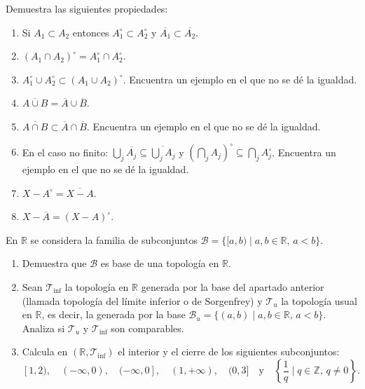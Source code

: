 \begin{ejer}[38]
Demuestra las siguientes propiedades:
\begin{enumerate}
    \item[a)] Si $A_1 \subset A_2$ entonces $A_1^\circ \subset A_2^\circ$ y $\overline{A_1} \subset \overline{A_2}$.
    \item[b)] $(A_1 \cap A_2)^\circ = A_1^\circ \cap A_2^\circ$.
    \item[c)] $A_1^\circ \cup A_2^\circ \subset (A_1 \cup A_2)^\circ$. Encuentra un ejemplo en el que no se dé la igualdad.
    \item[d)] $\overline{A \cup B} = \overline{A} \cup \overline{B}$.
    \item[e)] $\overline{A \cap B} \subset \overline{A} \cap \overline{B}$. Encuentra un ejemplo en el que no se dé la igualdad.
    \item[f)] En el caso no finito: $\bigcup_j \overline{A_j} \subseteq \overline{\bigcup_j A_j}$ y $\left(\bigcap_j A_j\right)^\circ \subseteq \bigcap_j A_j^\circ$. Encuentra un ejemplo en el que no se dé la igualdad.
    \item[g)] $X - A^\circ = \overline{X - A}$.
    \item[h)] $X - \overline{A} = (X - A)^\circ$.
\end{enumerate}
\end{ejer}

\begin{ejer}[39]
En $\mathbb{R}$ se considera la familia de subconjuntos $\mathcal{B} = \{[a,b) \mid a,b \in \mathbb{R}, \, a < b\}$.
\begin{enumerate}
    \item[a)] Demuestra que $\mathcal{B}$ es base de una topología en $\mathbb{R}$.
    \item[b)] Sean $\mathcal{T}_{\mathrm{inf}}$ la topología en $\mathbb{R}$ generada por la base del apartado anterior (llamada topología del límite inferior o de Sorgenfrey) y $\mathcal{T}_u$ la topología usual en $\mathbb{R}$, es decir, la generada por la base $\mathcal{B}_u = \{(a,b) \mid a,b \in \mathbb{R}, \, a < b\}$. Analiza si $\mathcal{T}_u$ y $\mathcal{T}_{\mathrm{inf}}$ son comparables.
    \item[c)] Calcula en $(\mathbb{R}, \mathcal{T}_{\mathrm{inf}})$ el interior y el cierre de los siguientes subconjuntos:
    \[
        [1,2), \quad (-\infty, 0), \quad (-\infty, 0], \quad (1, +\infty), \quad (0, 3] \quad \text{y} \quad \left\{\frac{1}{q} \mid q \in \mathbb{Z}, \, q \neq 0\right\}.
    \]
\end{enumerate}
\end{ejer}

